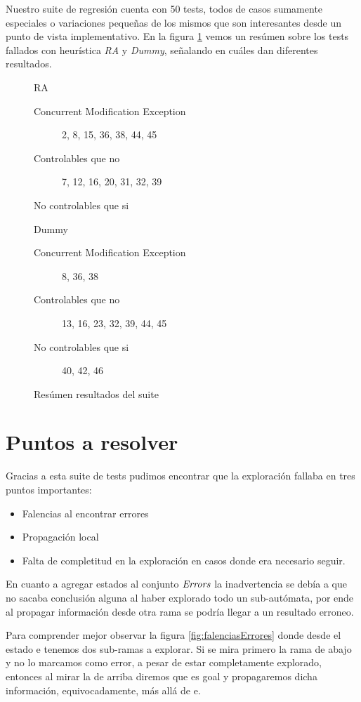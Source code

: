 Nuestro suite de regresión cuenta con 50 tests, todos de casos sumamente especiales o variaciones pequeñas de los mismos que son interesantes desde un punto de vista implementativo. En la figura \ref{fig:resultadosTest} vemos un resúmen sobre los tests fallados con heurística \textit{RA} y \textit{Dummy}, señalando en cuáles dan diferentes resultados. 

\begin{figure}
    \large{RA}
    \begin{description}
     \item[Concurrent Modification Exception] 2, 8, 15, 36, 38, 44, 45
     \item[Controlables que no] 7, 12, 16, 20, 31, 32, 39
     \item[No controlables que si] 
    \end{description}

    
    \large{Dummy}
    \begin{description}
     \item[Concurrent Modification Exception] 8, 36, 38
     \item[Controlables que no] 13, 16, 23, 32, 39, 44, 45
     \item[No controlables que si] 40, 42, 46
    \end{description}
    \caption{Resúmen resultados del suite}
    \label{fig:resultadosTest}
\end{figure}


\section{Puntos a resolver}
Gracias a esta suite de tests pudimos encontrar que la exploración fallaba en tres puntos importantes:
\begin{itemize}
 \item Falencias al encontrar errores
 \item Propagación local
 \item Falta de completitud en la exploración en casos donde era necesario seguir.
\end{itemize}

En cuanto a agregar estados al conjunto $\mathit{Errors}$ la inadvertencia se debía a que no sacaba conclusión alguna al haber explorado todo un sub-autómata, por ende al propagar información desde otra rama se podría llegar a un resultado erroneo. 

Para comprender mejor observar la figura \ref{fig:falenciasErrores} donde desde el estado e tenemos dos sub-ramas a explorar. Si se mira primero la rama de abajo y no lo marcamos como error, a pesar de estar completamente explorado, entonces al mirar la de arriba diremos que es goal y propagaremos dicha información, equivocadamente, más allá de e. 

